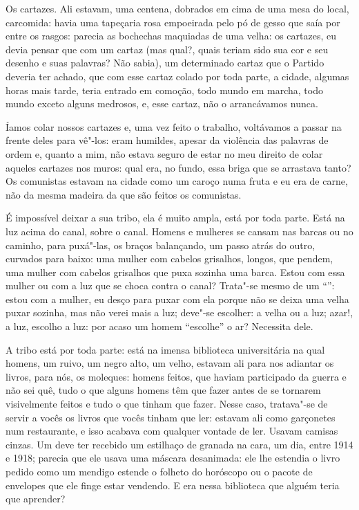 Os cartazes. Ali estavam, uma centena, dobrados em cima de uma mesa do
local, carcomida: havia uma tapeçaria rosa empoeirada pelo pó de gesso
que saía por entre os rasgos: parecia as bochechas maquiadas de uma
velha: os cartazes, eu devia pensar que com um cartaz (mas qual?, quais
teriam sido sua cor e seu desenho e suas palavras? Não sabia), um
determinado cartaz que o Partido deveria ter achado, que com esse cartaz
colado por toda parte, a cidade, algumas horas mais tarde, teria entrado
em comoção, todo mundo em marcha, todo mundo exceto alguns medrosos, e,
esse cartaz, não o arrancávamos nunca.

Íamos colar nossos cartazes e, uma vez feito o trabalho, voltávamos a
passar na frente deles para vê"-los: eram humildes, apesar da violência
das palavras de ordem e, quanto a mim, não estava seguro de estar no meu
direito de colar aqueles cartazes nos muros: qual era, no fundo, essa
briga que se arrastava tanto? Os comunistas estavam na cidade como um
caroço numa fruta e eu era de carne, não da mesma madeira da que são
feitos os comunistas.

É impossível deixar a sua tribo, ela é muito ampla, está por toda parte.
Está na luz acima do canal, sobre o canal. Homens e mulheres se cansam
nas barcas ou no caminho, para puxá"-las, os braços balançando, um passo
atrás do outro, curvados para baixo: uma mulher com cabelos grisalhos,
longos, que pendem, uma mulher com cabelos grisalhos que puxa sozinha
uma barca. Estou com essa mulher ou com a luz que se choca contra o
canal? Trata"-se mesmo de um ``'': estou com a mulher, eu desço para
puxar com ela porque não se deixa uma velha puxar sozinha, mas não verei
mais a luz; deve"-se escolher: a velha ou a luz; azar!, a luz, escolho a
luz: por acaso um homem ``escolhe'' o ar? Necessita dele.

A tribo está por toda parte: está na imensa biblioteca universitária na
qual homens, um ruivo, um negro alto, um velho, estavam ali para nos
adiantar os livros, para nós, os moleques: homens feitos, que haviam
participado da guerra e não sei quê, tudo o que alguns homens têm que
fazer antes de se tornarem visivelmente feitos e tudo o que tinham que
fazer. Nesse caso, tratava"-se de servir a vocês os livros que vocês
tinham que ler: estavam ali como garçonetes num restaurante, e isso
acabava com qualquer vontade de ler. Usavam camisas cinzas. Um deve ter
recebido um estilhaço de granada na cara, um dia, entre 1914 e 1918;
parecia que ele usava uma máscara desanimada: ele lhe estendia o livro
pedido como um mendigo estende o folheto do horóscopo ou o pacote de
envelopes que ele finge estar vendendo. E era nessa biblioteca que
alguém teria que aprender?

